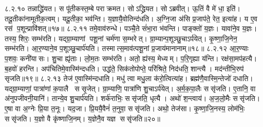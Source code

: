 ८.२.१०
तन्नाद्ध्रि॑यत। स पू॑तीकस्त॒म्बे पराक्रमत। सोऽद्ध्रियत। सोऽब्रवीत्। ऊ॒तिं वै मे॑ धा॒ इति॑। तदू॒तीका॑नामूतीक॒त्वम्। यदू॒तीका॒ भव॑न्ति। य॒ज्ञायै॒वोतिन्द॑धति। अ॒ग्नि॒जा अ॑सि प्र॒जाप॑ते॒ रेत॒ इत्या॑ह। य ए॒व रस॑ प॒शून्प्रावि॑शत्॥१७॥
८.२.११
तमे॒वाव॑रुन्धे। पञ्चै॒ते सं॑भा॒रा भ॑वन्ति। पाङ्क्तो॑ य॒ज्ञः। यावा॑ने॒व य॒ज्ञः। तस्य॒ शिरः॒ सम्भ॑रति। यद्ग्रा॒म्याणां पशू॒नां चर्म॑णा स॒म्भरेत्। ग्रा॒म्यान्प॒शूञ्छु॒चाऽर्प॑येत्। कृ॒ष्णा॒जि॒नेन॒ सम्भ॑रति। आ॒र॒ण्याने॒व प॒शूञ्छु॒चार्प॑यति। तस्मात्स॒माव॑त्पशू॒नां प्र॒जाय॑मानानाम्॥१८॥
८.२.१२
आ॒र॒ण्याः प॒शवः॒ कनी॑यासः। शु॒चा ह्यृ॑ताः। लो॒म॒तः सम्भ॑रति। अतो॒ ह्य॑स्य॒ मेध्यम्। प॒रि॒गृह्या य॑न्ति। रक्ष॑सा॒मप॑हत्यै। ब॒हवो॑ हरन्ति। अप॑चितिमे॒वास्मि॑न्दधति। उद्ध॑ते॒ सिक॑तोपोप्ते॒ परि॑श्रिते॒ निद॑धति॒ शान्त्यै। मद॑न्तीभि॒रुप॑ सृजति॥१९॥
८.२.१३
तेज॑ ए॒वास्मि॑न्दधाति। मधु॑ त्वा मधु॒ला क॑रो॒त्वित्या॑ह। ब्रह्म॑णै॒वास्मि॒न्तेजो॑ दधाति। यद्ग्रा॒म्याणां॒ पात्रा॑णां क॒पालै ससृ॒जेत्। ग्रा॒म्याणि॒ पात्रा॑णि शु॒चाऽर्प॑येत्। अ॒र्म॒क॒पा॒लैः ससृ॑जति। ए॒तानि॒ वा अ॑नुपजीवनी॒यानि॑। तान्ये॒व शु॒चार्प॑यति। शर्क॑राभिः॒ ससृ॑जति॒ धृत्यै। अथो॑ श॒न्त्वाय॑। अ॒ज॒लो॒मैः ससृ॑जति। ए॒षा वा अ॒ग्नेः प्रि॒या त॒नूः। यद॒जा। प्रि॒ययै॒वैनं॑ त॒नुवा॒ ससृ॑जति। अथो॒ तेज॑सा। कृ॒ष्णा॒जि॒नस्य॒ लोम॑भिः॒ ससृ॑जति। य॒ज्ञो वै कृ॑ष्णाजि॒नम्। य॒ज्ञेनै॒व यज्ञ ससृ॑जति॥२०॥
\anuvakamend

